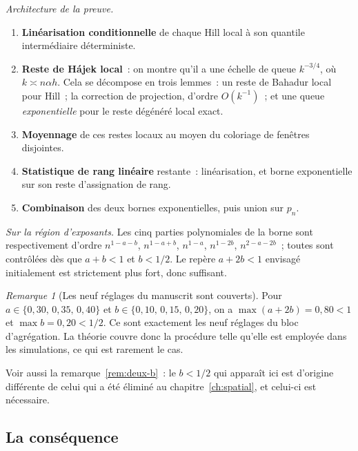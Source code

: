 \documentclass[11pt]{article}
\theoremstyle{plain}
\theoremstyle{definition}
\theoremstyle{remark}
\newtheorem{remarque}[theoreme]{Remarque}
\newcommand{\1}{\mathbf 1}
\begin{document}
\noindent
\emph{Architecture de la preuve.}
\begin{enumerate}[leftmargin=2em,itemsep=3pt]
\item \textbf{Linéarisation conditionnelle} de chaque Hill local à son
quantile intermédiaire déterministe.
\item \textbf{Reste de Hájek local}~: on montre qu'il a une échelle de
queue $k^{-3/4}$, où $k\asymp n\alpha h$. Cela se décompose en trois
lemmes~: un reste de Bahadur local pour Hill~; la correction de
projection, d'ordre $O(k^{-1})$~; et une queue \emph{exponentielle} pour
le reste dégénéré local exact.
\item \textbf{Moyennage} de ces restes locaux au moyen du coloriage de
fenêtres disjointes.
\item \textbf{Statistique de rang linéaire} restante~: linéarisation, et
borne exponentielle sur son reste d'assignation de rang.
\item \textbf{Combinaison} des deux bornes exponentielles, puis union sur
$p_n$.
\end{enumerate}

\noindent
\emph{Sur la région d'exposants.} Les cinq parties polynomiales de la
borne sont respectivement d'ordre $n^{1-a-b}$, $n^{1-a+b}$, $n^{1-a}$,
$n^{1-2b}$, $n^{2-a-2b}$~; toutes sont contrôlées dès que $a+b<1$ et
$b<1/2$. Le repère $a+2b<1$ envisagé initialement est strictement plus
fort, donc suffisant.

\begin{remarque}[Les neuf réglages du manuscrit sont couverts]
Pour $a\in\{0{,}30,\,0{,}35,\,0{,}40\}$ et
$b\in\{0{,}10,\,0{,}15,\,0{,}20\}$, on a $\max(a+2b)=0{,}80<1$ et
$\max b=0{,}20<1/2$. Ce sont exactement les neuf réglages du bloc
d'agrégation. La théorie couvre donc la procédure telle qu'elle est
employée dans les simulations, ce qui est rarement le cas.
\end{remarque}

\noindent
Voir aussi la remarque~\ref{rem:deux-b}~: le $b<1/2$ qui apparaît ici est
d'origine différente de celui qui a été éliminé au
chapitre~\ref{ch:spatial}, et celui-ci est nécessaire.

\subsection{La conséquence}
\end{document}
